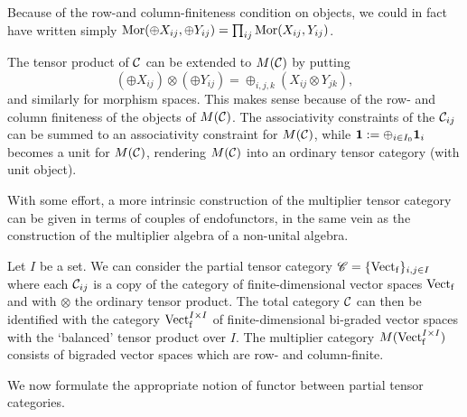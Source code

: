 \begin{Rem} Because of the row-and column-finiteness condition on objects, we could in fact have written simply $\mathrm{Mor}(\oplus X_{ij},\oplus Y_{ij}) = \prod_{ij} \mathrm{Mor}(X_{ij},Y_{ij})$. 
\end{Rem} 

The tensor product of $\mathcal{C}$ can be extended to $M(\mathcal{C})$ by putting \[\left(\oplus X_{ij}\right)\otimes \left(\oplus Y_{ij}\right) = \oplus_{i,j,k} \left(X_{ij}\otimes Y_{jk}\right),\] and similarly for morphism spaces. This makes sense because of the row- and column finiteness of the objects of $M(\mathcal{C})$. The associativity constraints of the $\mathcal{C}_{ij}$ can be summed to an associativity constraint for $M(\mathcal{C})$, while $\mathbf{1} := \oplus_{i\in I_0} \mathbf{1}_i$ becomes a unit for $M(\mathcal{C})$, rendering $M(\mathcal{C})$ into an ordinary tensor category (with unit object).

\begin{Rem} With some effort, a more intrinsic construction of the multiplier tensor category can be given in terms of couples of endofunctors, in the same vein as the construction of the multiplier algebra of a non-unital algebra.
\end{Rem} 

\begin{Exa}\label{ExaVectBiGr} Let $I$ be a set. We can consider the partial tensor category $\mathscr{C} = \{\mathrm{Vect}_{\operatorname{\mathrm{f}}}\}_{i,j\in I}$ where each $\mathcal{C}_{ij}$ is a copy of the category of finite-dimensional vector spaces $\mathrm{Vect}_{\operatorname{\mathrm{f}}}$ and with $\otimes$ the ordinary tensor product. The total category $\mathcal{C}$ can then be identified with the category $\mathrm{Vect}^{I\times I}_{\operatorname{\mathrm{f}}}$ of finite-dimensional bi-graded vector spaces with the `balanced' tensor product over $I$. The multiplier category $M(\mathrm{Vect}^{I\times I}_{\operatorname{\mathrm{f}}})$ consists of bigraded vector spaces which are row- and column-finite.
\end{Exa}

We now formulate the appropriate notion of functor between partial tensor categories.

